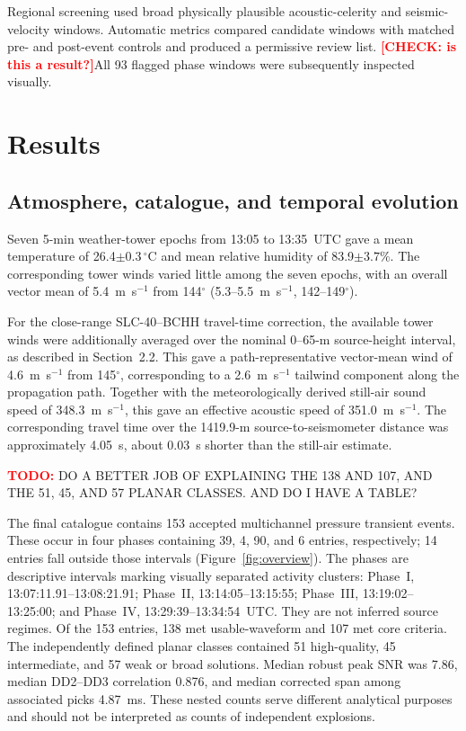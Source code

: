 \documentclass[]{seismica}
\newcommand{\todo}[1]{%
  \par\noindent
  \colorbox{yellow!40}{%
    \parbox{0.96\linewidth}{%
      \textbf{\textcolor{red}{TODO:}} #1
    }%
  }%
  \par
}
\newcommand{\checkme}[1]{\textcolor{red}{\textbf{[CHECK: #1]}}}
\begin{document}
Regional screening used broad physically plausible acoustic-celerity and
seismic-velocity windows. Automatic metrics compared candidate windows with matched pre- and post-event
controls and produced a permissive review list. \checkme{is this a result?}All 93 flagged phase windows
were subsequently inspected visually. 

\section{Results}
\label{sec:results}

\subsection{Atmosphere, catalogue, and temporal evolution}
\label{sec:temporal_evolution}

Seven 5-min weather-tower epochs from 13:05 to 13:35~UTC gave a mean
temperature of 26.4$\pm0.3\,^{\circ}$C and mean relative humidity of
83.9$\pm3.7\%$. The corresponding tower winds varied little among the seven
epochs, with an overall vector mean of 5.4~m~s$^{-1}$ from 144$^\circ$
(5.3--5.5~m~s$^{-1}$, 142--149$^\circ$).

For the close-range SLC-40--BCHH travel-time correction, the available tower
winds were additionally averaged over the nominal 0--65-m source-height
interval, as described in Section~2.2. This gave a path-representative
vector-mean wind of 4.6~m~s$^{-1}$ from 145$^\circ$, corresponding to a
2.6~m~s$^{-1}$ tailwind component along the propagation path. Together with
the meteorologically derived still-air sound speed of 348.3~m~s$^{-1}$, this
gave an effective acoustic speed of 351.0~m~s$^{-1}$. The corresponding travel
time over the 1419.9-m source-to-seismometer distance was approximately
4.05~s, about 0.03~s shorter than the still-air estimate.

\todo{DO A BETTER JOB OF EXPLAINING THE 138 AND 107, AND THE 51, 45, AND 57 PLANAR CLASSES. AND DO I HAVE A TABLE?}
The final catalogue contains 153 accepted multichannel pressure transient events.
These occur in four phases containing 39, 4, 90, and 6 entries,
respectively; 14 entries fall outside those intervals
(Figure~\ref{fig:overview}). The phases are descriptive intervals marking
visually separated activity clusters: Phase~I, 13:07:11.91--13:08:21.91;
Phase~II, 13:14:05--13:15:55; Phase~III, 13:19:02--13:25:00; and Phase~IV,
13:29:39--13:34:54~UTC. They are not inferred source regimes. Of the 153
entries, 138 met usable-waveform and 107 met core
criteria. The independently defined planar classes contained 51 high-quality,
45 intermediate, and 57 weak or broad solutions. Median robust peak SNR was
7.86, median DD2--DD3 correlation 0.876, and median corrected span among
associated picks 4.87~ms. These nested counts serve different analytical
purposes and should not be interpreted as counts of independent explosions.
\end{document}
